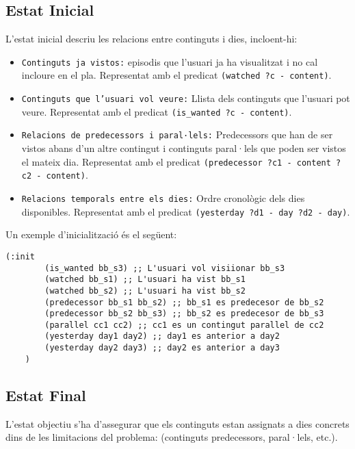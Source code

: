 \documentclass[a4paper]{article}
\begin{document}
	\subsection{Estat Inicial}
	
	L'estat inicial descriu les relacions entre continguts i dies, incloent-hi:
	
	\begin{itemize}
		\item \texttt{Continguts ja vistos:} episodis que l'usuari ja ha visualitzat i no cal incloure en el pla. Representat amb el predicat \texttt{(watched ?c - content)}.
		\item \texttt{Continguts que l'usuari vol veure:} Llista dels continguts que l'usuari pot veure. Representat amb el predicat \texttt{(is\_wanted ?c - content)}.
		\item \texttt{Relacions de predecessors i paral·lels:} Predecessors que han de ser vistos abans d’un altre contingut i continguts paral·lels que poden ser vistos el mateix dia. Representat amb el predicat \texttt{(predecessor ?c1 - content ?c2 - content)}.
		\item \texttt{Relacions temporals entre els dies:} Ordre cronològic dels dies disponibles. Representat amb el predicat \texttt{(yesterday ?d1 - day ?d2 - day)}.
	\end{itemize}
	
	Un exemple d'inicialització és el següent:
	
	\begin{lstlisting}[language=PDDL, caption={Exemple d'inicialització del problema}, label={lst:ini_problema}]
	(:init
		(is_wanted bb_s3) ;; L'usuari vol visiionar bb_s3
		(watched bb_s1) ;; L'usuari ha vist bb_s1
		(watched bb_s2) ;; L'usuari ha vist bb_s2
		(predecessor bb_s1 bb_s2) ;; bb_s1 es predecesor de bb_s2
		(predecessor bb_s2 bb_s3) ;; bb_s2 es predecesor de bb_s3
		(parallel cc1 cc2) ;; cc1 es un contingut parallel de cc2
		(yesterday day1 day2) ;; day1 es anterior a day2
		(yesterday day2 day3) ;; day2 es anterior a day3
	)
	\end{lstlisting}
	
	\subsection{Estat Final}
	
	L'estat objectiu s’ha d’assegurar que els continguts estan assignats a dies concrets dins de les limitacions del problema: (continguts predecessors, paral·lels, etc.).
	
\end{document}

